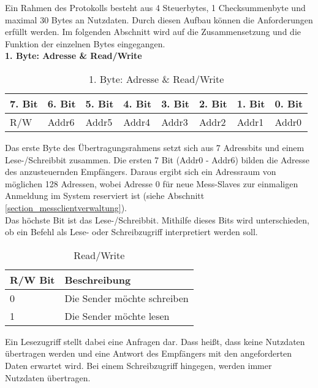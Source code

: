 Ein Rahmen des Protokolls besteht aus 4 Steuerbytes, 1 Checksummenbyte und maximal 30 Bytes an Nutzdaten. Durch diesen Aufbau können die Anforderungen erfüllt werden. Im folgenden Abschnitt wird auf die Zusammensetzung und die Funktion der einzelnen Bytes eingegangen.\\



\newpage
\textbf{1. Byte: Adresse \& Read/Write}

\begin{table}[H]
\begin{center}
\begin{tabularx}{\textwidth}{|X|X|X|X|X|X|X|X|}\hline
 7. Bit & 6. Bit & 5. Bit & 4. Bit & 3. Bit & 2. Bit & 1. Bit & 0. Bit\\ \hline
 R/W & Addr6 & Addr5 & Addr4 & Addr3 & Addr2 & Addr1 & Addr0\\ \hline
\end{tabularx}
\caption{1. Byte: Adresse \& Read/Write}
\label{table_1Byte}
\end{center}
\end{table}

Das erste Byte des Übertragungsrahmens setzt sich aus 7 Adressbits und einem Lese-/Schreibbit zusammen. Die ersten 7 Bit (Addr0 - Addr6) bilden die Adresse des anzusteuernden Empfängers. Daraus ergibt sich ein Adressraum von möglichen 128 Adressen, wobei Adresse 0 für neue Mess-Slaves zur einmaligen Anmeldung im System reserviert ist (siehe Abschnitt \ref{section_messclientverwaltung}).\\
Das höchste Bit ist das Lese-/Schreibbit. Mithilfe dieses Bits wird unterschieden, ob ein Befehl als Lese- oder Schreibzugriff interpretiert werden soll.

\begin{table}[H]
\begin{center}
\begin{tabular}{|l|l|}\hline
 R/W Bit & Beschreibung \\ \hline
 0 & Die Sender möchte schreiben \\ \hline
 1 & Die Sender möchte lesen \\ \hline
\end{tabular}
\caption{Read/Write}
\label{table_RW}
\end{center}
\end{table}

Ein Lesezugriff stellt dabei eine Anfragen dar. Dass heißt, dass keine Nutzdaten übertragen werden und eine Antwort des Empfängers mit den angeforderten Daten erwartet wird. Bei einem Schreibzugriff hingegen, werden immer Nutzdaten übertragen.\\


